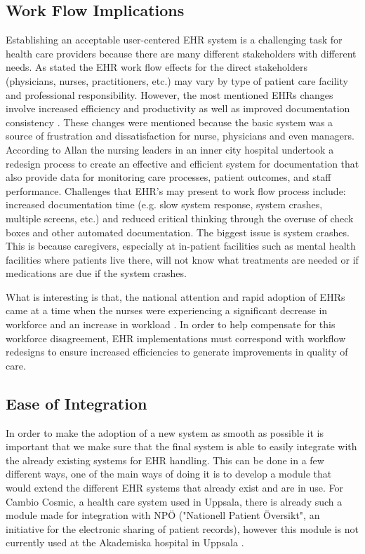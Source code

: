 \documentclass[14pt]{article}
\begin{document}
\subsection{Work Flow Implications}
\label{sec:peopleWorkflow}
Establishing an acceptable user-centered \gls{EHR} system is a challenging task for health care providers because there are many different stakeholders with different needs. As stated the \gls{EHR} work flow effects for the direct stakeholders (physicians, nurses, practitioners, etc.) may vary by type of patient care facility and professional responsibility. However, the most mentioned \glspl{EHR} changes involve increased efficiency and productivity as well as improved documentation consistency \cite{Allan}. These changes were mentioned because the basic system was a source of frustration and dissatisfaction for nurse, physicians and even managers. According to Allan \cite{Allan} the nursing leaders in an inner city hospital undertook a redesign process to create an effective and efficient system for documentation that also provide data for monitoring care processes, patient outcomes, and staff performance. Challenges that \gls{EHR}'s may present to work flow process include: increased documentation time (e.g. slow system response, system crashes, multiple screens, etc.) and reduced critical thinking through the overuse of check boxes and other automated documentation. The biggest issue is system crashes. This is because caregivers, especially at in-patient facilities such as mental health facilities where patients live there, will not know what treatments are needed or if medications are due if the system crashes. 

What is interesting is that, the national attention and rapid adoption of \gls{EHR}s came at a time when the nurses were experiencing a significant decrease in workforce and an increase in workload \cite{Mitre}. In order to help compensate for this workforce disagreement, \gls{EHR} implementations must correspond with workflow redesigns to ensure increased efficiencies to generate improvements in quality of care. 

\subsection{Ease of Integration}
In order to make the adoption of a new system as smooth as possible it is important that we make sure that the final system is able to easily integrate with the already existing systems for \gls{EHR} handling. This can be done in a few different ways, one of the main ways of doing it is to develop a module that would extend the different \gls{EHR} systems that already exist and are in use.\cite{EPJ2} For Cambio Cosmic, a health care system used in Uppsala, there is already such a module made for integration with NPÖ ("Nationell Patient Översikt", an initiative for the electronic sharing of patient records), however this module is not currently used at the Akademiska hospital in Uppsala \cite{EPJ1}.
\end{document}
